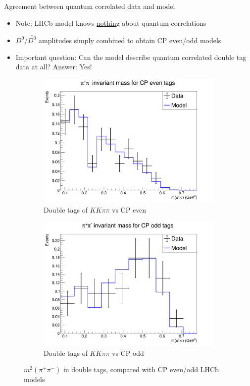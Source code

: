 \documentclass{beamer}
\begin{document}
\begin{frame}{Agreement between quantum correlated data and model}
  \begin{itemize}
    \item{Note: LHCb model knows \underline{nothing} about quantum correlations}
    \item{$D^0$/$\bar{D^0}$ amplitudes simply combined to obtain CP even/odd models}
    \item{Important question: Can the model describe quantum correlated double tag data at all? Answer: Yes!}
  \end{itemize}
  \begin{figure}
    \begin{subfigure}{0.50\textwidth}
      \includegraphics[width = 1.0\textwidth]{Plots/s23_DataModel_CPEvenTags.png}
      \caption{Double tags of $KK\pi\pi$ vs CP even}
    \end{subfigure}%
    \begin{subfigure}{0.50\textwidth}
      \includegraphics[width = 1.0\textwidth]{Plots/s23_DataModel_CPOddTags.png}
      \caption{Double tags of $KK\pi\pi$ vs CP odd}
    \end{subfigure}
    \caption{$m^2(\pi^+\pi^-)$ in double tags, compared with CP even/odd LHCb models}
  \end{figure}
\end{frame}
\end{document}
